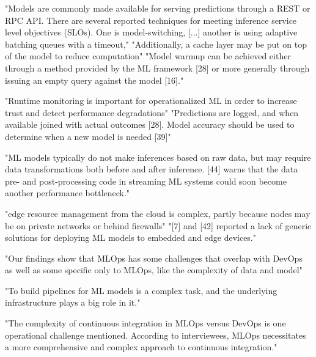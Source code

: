 "Models are commonly made available for serving predictions through a REST or
RPC API. There are several reported techniques for meeting inference service
level objectives (SLOs). One is model-switching, [...] another is using adaptive
batching queues with a timeout,"
"Additionally, a cache layer may be put on top of the model to reduce
computation"
"Model warmup can be achieved either through a method provided by the ML
framework [28] or more generally through issuing an empty query against the
model [16]."

"Runtime monitoring is important for operationalized ML in order to increase
trust and detect performance degradations"
"Predictions are logged, and when available joined with actual outcomes [28].
Model accuracy should be used to determine when a new model is needed [39]"

"ML models typically do not make inferences based on raw data, but may require
data transformations both before and after inference. [44] warns that the data
pre- and post-processing code in streaming ML systems could soon become another
performance bottleneck."

"edge resource management from the cloud is complex, partly because nodes may be
on private networks or behind firewalls"
"[7] and [42] reported a lack of generic solutions for deploying ML models to
embedded and edge devices."


\parencite{KolarNarayanappa2024AnMLOps}

"Our findings show that MLOps has some challenges that overlap with DevOps as
well as some specific only to MLOps, like the complexity of data and model"

"To build pipelines for ML models is a complex task, and the underlying
infrastructure plays a big role in it."

"The complexity of continuous integration in MLOps versus DevOps is one
operational challenge mentioned. According to interviewees, MLOps necessitates a
more comprehensive and complex approach to continuous integration."


\parencite{Kreuzberger2023MachineArchitecture}

